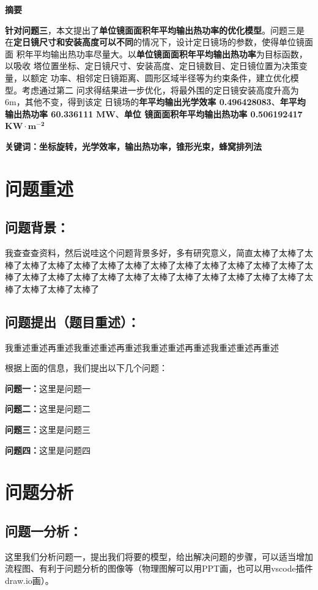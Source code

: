 \documentclass[zihao=-4, UTF8]{article}		%
\theoremstyle{MyLineTheoremStyle} %
\theoremstyle{MyBlockTheoremStyle} %
\theoremstyle{MySubsubsectionStyle} %
\newcommand{\cnabstractname}{\large 摘要}
\newenvironment{cnabstract}{%
        \par
        \noindent\mbox{}\hfill{\bfseries \cnabstractname}\hfill\mbox{}\par
        }{\par}
\begin{document}
\begin{cnabstract}
{\textbf{针对问题三}，本文提出了\textbf{单位镜面面积年平均输出热功率的优化模型}。问题三是
在\textbf{定日镜尺寸和安装高度可以不同}的情况下，设计定日镜场的参数，使得单位镜面面
积年平均输出热功率尽量大。以\textbf{单位镜面面积年平均输出热功率}为目标函数，以吸收
塔位置坐标、定日镜尺寸、安装高度、定日镜数目、定日镜位置为决策变量，以额定
功率、相邻定日镜距离、圆形区域半径等为约束条件，建立优化模型。考虑通过第二
问求得结果进一步优化，将最外围的定日镜安装高度升高为 6m，其他不变，得到该定
日镜场的\textbf{年平均输出光学效率 0.496428083}、\textbf{年平均输出热功率 60.336111} $\mathbf{MW}$、\textbf{单位
镜面面积年平均输出热功率 0.506192417} $\mathbf{KW \cdot m^{-2}}$  
}\par
\vspace{12pt}
{\normalsize \textbf{关键词：坐标旋转，光学效率，输出热功率，锥形光束，蜂窝排列法}}
\end{cnabstract}



\setlength{\parindent}{2em}

\newpage
\section{问题重述}
\subsection{问题背景：}
我查查查资料，然后说哇这个问题背景多好，多有研究意义，简直太棒了太棒了太棒了太棒了太棒了太棒了太棒了太棒了太棒了太棒了太棒了太棒了太棒了太棒了太棒了太棒了太棒了太棒了太棒了太棒了太棒了太棒了太棒了太棒了太棒了太棒了太棒了太棒了太棒了太棒了
\subsection{问题提出（题目重述）：}
我重述重述再重述我重述重述再重述我重述重述再重述我重述重述再重述\par
根据上面的信息，我们提出以下几个问题：\par
\textbf{问题一：}这里是问题一\par
\textbf{问题二：}这里是问题二\par
\textbf{问题三：}这里是问题三\par
\textbf{问题四：}这里是问题四\par

\section{问题分析}
\subsection{问题一分析：}
这里我们分析问题一，提出我们将要的模型，给出解决问题的步骤，可以适当增加流程图、有利于问题分析的图像等（物理图解可以用PPT画，也可以用vscode插件draw.io画）。
\end{document}
